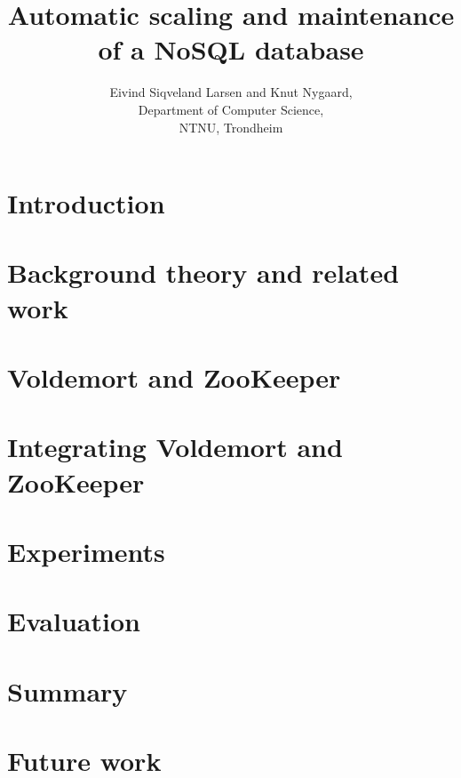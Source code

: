 \documentclass[a4paper, 12pt]{report}
\title{Automatic scaling and maintenance of a NoSQL database}
\author{Eivind Siqveland Larsen and Knut Nygaard,\\
        Department of Computer Science,\\
        NTNU,
        Trondheim}
\begin{document}
\maketitle
\thispagestyle{empty}

\clearpage


\clearpage


\clearpage


\clearpage

\tableofcontents
\clearpage


\listoffigures
\clearpage
\setcounter{page}{1}

\chapter{Introduction}
\label{chapter:introduction}


\clearpage


\clearpage

\chapter{Background theory and related work}
\label{chapter:background}

\clearpage


\clearpage


\clearpage



\chapter{Voldemort and ZooKeeper}
\label{chapter:voldemort_and_zookeeper}


\clearpage


\clearpage

\chapter{Integrating Voldemort and ZooKeeper}
\label{chapter:implementation}

\clearpage

\chapter{Experiments}
\label{chapter:results}



\chapter{Evaluation}
\label{chapter:evaluation}


\chapter{Summary}
\label{chapter:summary}


\chapter{Future work}
\label{chapter:futurework}




\end{document}
